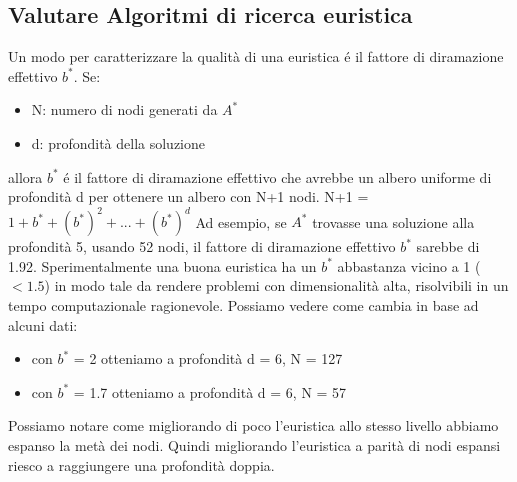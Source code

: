 \documentclass{article}
\begin{document}
\subsection{Valutare Algoritmi di ricerca euristica}
Un modo per caratterizzare la qualità di una euristica é il fattore di diramazione effettivo $b^*$. \newline
Se:
\begin{itemize}
    \item N: numero di nodi generati da $A^*$
    \item d: profondità della soluzione
\end{itemize}
allora $b^*$ é il fattore di diramazione effettivo che avrebbe un albero uniforme di profondità d per ottenere un albero con N+1 nodi. \newline
N+1 = $1 + b^* + (b^*)^2 + ... + (b^*)^d$ \newline
Ad esempio, se $A^*$ trovasse una soluzione alla profondità 5, usando 52 nodi, il fattore di diramazione effettivo $b^*$ sarebbe di 1.92. \newline
Sperimentalmente una buona euristica ha un $b^*$ abbastanza vicino a 1 ($< 1.5$) in modo tale da rendere problemi con dimensionalità alta, risolvibili in un tempo computazionale ragionevole.\newline
Possiamo vedere come cambia in base ad alcuni dati:
\begin{itemize}
    \item con $b^*$ = 2 otteniamo a profondità d = 6, N = 127
    \item con $b^*$ = 1.7 otteniamo a profondità d = 6, N = 57
\end{itemize}
Possiamo notare come migliorando di poco l'euristica allo stesso livello abbiamo espanso la metà dei nodi. Quindi migliorando l'euristica a parità di nodi espansi riesco a raggiungere una profondità doppia.
\clearpage
\end{document}
